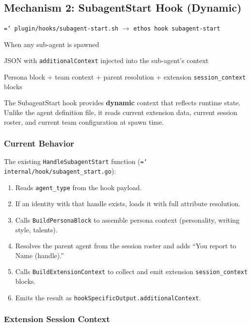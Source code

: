 \documentclass[a4paper,10pt]{article}
\newcommand{\fpath}[1]{\texttt{\hyphenchar\font=`\/ #1}}
\newcommand{\field}[1]{\texttt{#1}}
\newcommand{\cmd}[1]{\texttt{#1}}
\begin{document}
\subsection{Mechanism 2: SubagentStart Hook (Dynamic)}
\label{sec:subagentstart}

\begin{description}[style=nextline]
  \item[Hook] \fpath{plugin/hooks/subagent-start.sh} $\to$
    \cmd{ethos hook subagent-start}
  \item[Fires] When any sub-agent is spawned
  \item[Output] JSON with \field{additionalContext} injected into the
    sub-agent's context
  \item[Content] Persona block + team context + parent resolution +
    extension \field{session\_context} blocks
\end{description}

The SubagentStart hook provides \textbf{dynamic} context that
reflects runtime state. Unlike the agent definition file, it reads
current extension data, current session roster, and current team
configuration at spawn time.

\subsubsection{Current Behavior}

The existing \cmd{HandleSubagentStart} function
(\fpath{internal/hook/subagent\_start.go}):

\begin{enumerate}
  \item Reads \field{agent\_type} from the hook payload.
  \item If an identity with that handle exists, loads it with full
    attribute resolution.
  \item Calls \cmd{BuildPersonaBlock} to assemble persona context
    (personality, writing style, talents).
  \item Resolves the parent agent from the session roster and adds
    ``You report to Name (handle).''
  \item Calls \cmd{BuildExtensionContext} to collect and emit
    extension \field{session\_context} blocks.
  \item Emits the result as
    \field{hookSpecificOutput.additionalContext}.
\end{enumerate}

\subsubsection{Extension Session Context}
\label{sec:ext-context}
\end{document}
